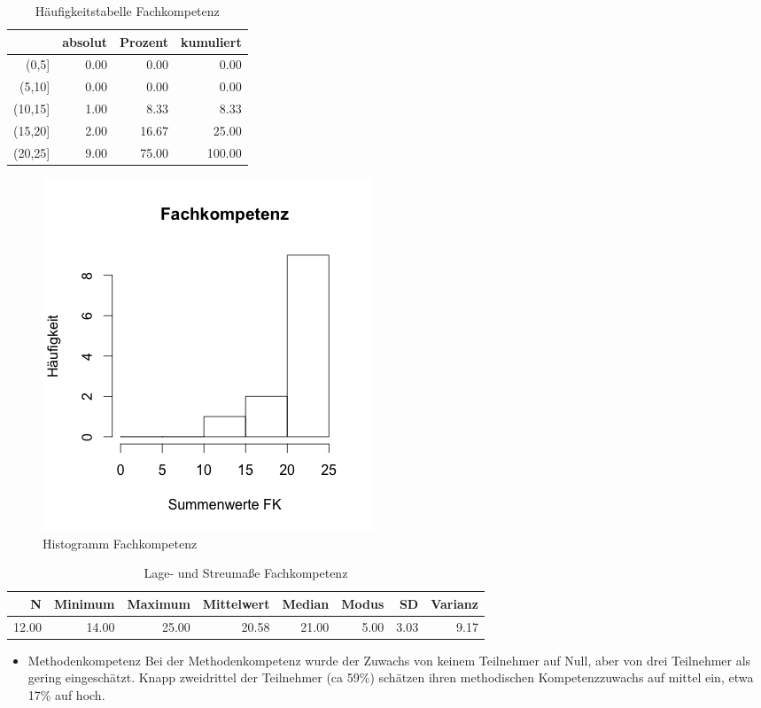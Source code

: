 \documentclass[12pt, bibliography=totoc]{scrartcl}
\begin{document}
\begin{table}[H]
\centering
\caption{Häufigkeitstabelle Fachkompetenz}
\begin{tabular}{rrrr}
  \hline
 & absolut & Prozent & kumuliert \\
  \hline
(0,5] & 0.00 & 0.00 & 0.00 \\
  (5,10] & 0.00 & 0.00 & 0.00 \\
  (10,15] & 1.00 & 8.33 & 8.33 \\
  (15,20] & 2.00 & 16.67 & 25.00 \\
  (20,25] & 9.00 & 75.00 & 100.00 \\
   \hline
\end{tabular}
\end{table}\begin{figure}[H]
\centering
\includegraphics{Anhang/FKHIST.png}
\caption{Histogramm Fachkompetenz}
\end{figure}

\begin{table}[H]
\centering
\caption{Lage- und Streumaße Fachkompetenz}
\begin{tabular}{rrrrrrrr}
  \hline
  N & Minimum & Maximum & Mittelwert & Median & Modus & SD & Varianz \\
  \hline
 12.00 & 14.00 & 25.00 & 20.58 & 21.00 & 5.00 & 3.03 & 9.17 \\
   \hline
\end{tabular}
\end{table}

\begin{itemize}
\tightlist
\item
  Methodenkompetenz Bei der Methodenkompetenz wurde der Zuwachs von
  keinem Teilnehmer auf Null, aber von drei Teilnehmer als gering
  eingeschätzt. Knapp zweidrittel der Teilnehmer (ca 59\%) schätzen
  ihren methodischen Kompetenzzuwachs auf mittel ein, etwa 17\% auf
  hoch.
\end{itemize}
\end{document}

